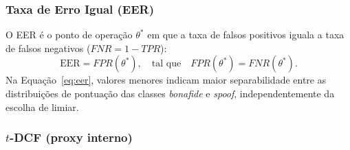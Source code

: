 \documentclass[12pt,a4paper]{article}
\begin{document}
\subsubsection*{Taxa de Erro Igual (EER)}

O EER é o ponto de operação $\theta^\ast$ em que a taxa de falsos positivos
iguala a taxa de falsos negativos ($FNR = 1 - TPR$):
\begin{equation}
\label{eq:eer}
\text{EER} = FPR(\theta^\ast), \quad \text{tal que} \quad FPR(\theta^\ast) = FNR(\theta^\ast).
\end{equation}
\noindent
Na Equação~\ref{eq:eer}, valores menores indicam maior separabilidade entre as
distribuições de pontuação das classes \textit{bonafide} e \textit{spoof},
independentemente da escolha de limiar.

\subsubsection*{$t$-DCF (proxy interno)}
\label{sec:tdcf_def}
\end{document}
